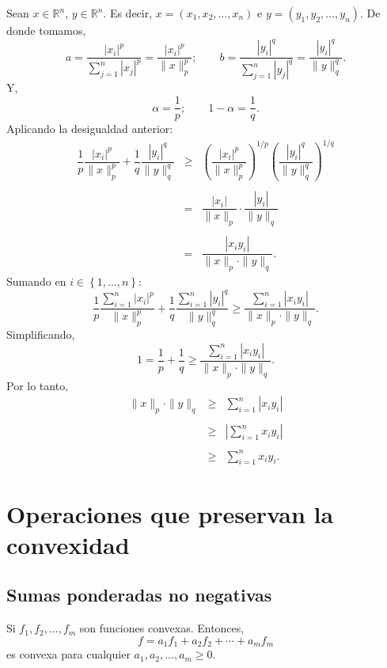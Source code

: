 \begin{paracol}{2}
\begin{proposicion}
    Sean $x\in \mathbb{R}^n$, $y\in \mathbb{R}^n$. Es decir, $x=(x_1,x_2,\ldots,x_n)$ e $y=(y_1,y_2,\ldots,y_n)$. De donde tomamos, 
    $$a=\dfrac{|x_i|^p}{\displaystyle\sum_{j=1}^{n}|x_j|^p}=\dfrac{|x_i|^p}{\|x\|_p^p};\qquad b=\dfrac{|y_i|^q}{\displaystyle\sum_{j=1}^{n}|y_j|^q}=\dfrac{|y_i|^q}{\|y\|_q^q}.$$
    Y,
    $$\alpha=\dfrac{1}{p};\qquad 1-\alpha=\dfrac{1}{q}.$$
    Aplicando la desigualdad anterior:
    $$
    \begin{array}{rcl}
	\dfrac{1}{p}\dfrac{|x_i|^p}{\|x\|_p^p}+\dfrac{1}{q}\dfrac{|y_i|^q}{\|y\|_q^q} &\geq & \left(\dfrac{|x_i|^p}{\|x\|_p^p}\right)^{1/p}\left(\dfrac{|y_i|^q}{\|y\|_q^q}\right)^{1/q}\\\\
											      &=&\dfrac{|x_i|}{\|x\|_p}\cdot \dfrac{|y_i|}{\|y\|_q}\\\\
													      &=&\dfrac{|x_iy_i|}{\|x\|_p\cdot \|y\|_q}.
    \end{array}
    $$
    Sumando en $i\in \left\{1,\ldots,n\right\}$:
    $$\dfrac{1}{p}\dfrac{\displaystyle\sum_{i=1}^n|x_i|^p}{\|x\|_p^p}+\dfrac{1}{q}\dfrac{\displaystyle\sum_{i=1}^n|y_i|^q}{\|y\|_q^q}\geq \dfrac{\displaystyle\sum_{i=1}^n|x_iy_i|}{\|x\|_p\cdot \|y\|_q}.$$
    Simplificando,
    $$1=\dfrac{1}{p}+\dfrac{1}{q}\geq \dfrac{\displaystyle\sum_{i=1}^n|x_iy_i|}{\|x\|_p\cdot \|y\|_q}.$$
    Por lo tanto,
    $$
    \begin{array}{rcl}
	\|x\|_p\cdot \|y\|_q&\geq & \displaystyle\sum_{i=1}^n|x_iy_i|\\\\
			    &\geq & \left|\displaystyle\sum_{i=1}^nx_iy_i\right|\\\\
			    &\geq & \displaystyle\sum_{i=1}^n x_iy_i.
    \end{array}
    $$
\end{proposicion}


\section{Operaciones que preservan la convexidad}

\subsection{Sumas ponderadas no negativas}

\begin{teo} Si $f_1,f_2,\ldots,f_m$ son funciones convexas. Entonces,
$$f=a_1f_1+a_2f_2+\cdots+a_mf_m$$
es convexa para cualquier $a_1,a_2,\ldots,a_m\geq 0$.


\end{teo}
\end{paracol}
